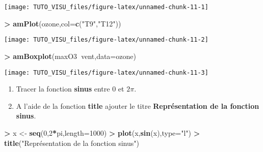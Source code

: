 \documentclass[]{article}
\newenvironment{Shaded}{\begin{snugshade}}{\end{snugshade}}
\newcommand{\DataTypeTok}[1]{\textcolor[rgb]{0.13,0.29,0.53}{#1}}
\newcommand{\DecValTok}[1]{\textcolor[rgb]{0.00,0.00,0.81}{#1}}
\newcommand{\KeywordTok}[1]{\textcolor[rgb]{0.13,0.29,0.53}{\textbf{#1}}}
\newcommand{\NormalTok}[1]{#1}
\newcommand{\OperatorTok}[1]{\textcolor[rgb]{0.81,0.36,0.00}{\textbf{#1}}}
\newcommand{\StringTok}[1]{\textcolor[rgb]{0.31,0.60,0.02}{#1}}
\providecommand{\tightlist}{%
  \setlength{\itemsep}{0pt}\setlength{\parskip}{0pt}}
\theoremstyle{definition}
\theoremstyle{definition}
\theoremstyle{definition}
\theoremstyle{remark}
\let\BeginKnitrBlock\begin \let\EndKnitrBlock\end
\begin{document}
\begin{center}\texttt{[image: TUTO\_VISU\_files/figure-latex/unnamed-chunk-11-1]} \end{center}

\begin{Shaded}
\begin{Highlighting}[]
\OperatorTok{>}\StringTok{ }\KeywordTok{amPlot}\NormalTok{(ozone,}\DataTypeTok{col=}\KeywordTok{c}\NormalTok{(}\StringTok{"T9"}\NormalTok{,}\StringTok{"T12"}\NormalTok{))}
\end{Highlighting}
\end{Shaded}

\begin{center}\texttt{[image: TUTO\_VISU\_files/figure-latex/unnamed-chunk-11-2]} \end{center}

\begin{Shaded}
\begin{Highlighting}[]
\OperatorTok{>}\StringTok{ }\KeywordTok{amBoxplot}\NormalTok{(maxO3}\OperatorTok{~}\NormalTok{vent,}\DataTypeTok{data=}\NormalTok{ozone)}
\end{Highlighting}
\end{Shaded}

\begin{center}\texttt{[image: TUTO\_VISU\_files/figure-latex/unnamed-chunk-11-3]} \end{center}

\BeginKnitrBlock{exercise}[Premier graphe]
\protect\hypertarget{exr:exo1}{}{\label{exr:exo1} \iffalse (Premier graphe) \fi{} }
\EndKnitrBlock{exercise}

\begin{enumerate}
\def\labelenumi{\arabic{enumi}.}
\tightlist
\item
  Tracer la fonction \textbf{sinus} entre \(0\) et \(2\pi\).
\item
  A l'aide de la fonction \textbf{title} ajouter le titre \textbf{Représentation de la fonction sinus}.
\end{enumerate}

\begin{Shaded}
\begin{Highlighting}[]
\OperatorTok{>}\StringTok{ }\NormalTok{x <-}\StringTok{ }\KeywordTok{seq}\NormalTok{(}\DecValTok{0}\NormalTok{,}\DecValTok{2}\OperatorTok{*}\NormalTok{pi,}\DataTypeTok{length=}\DecValTok{1000}\NormalTok{)}
\OperatorTok{>}\StringTok{ }\KeywordTok{plot}\NormalTok{(x,}\KeywordTok{sin}\NormalTok{(x),}\DataTypeTok{type=}\StringTok{"l"}\NormalTok{)}
\OperatorTok{>}\StringTok{ }\KeywordTok{title}\NormalTok{(}\StringTok{"Représentation de la fonction sinus"}\NormalTok{)}
\end{Highlighting}
\end{Shaded}
\end{document}
